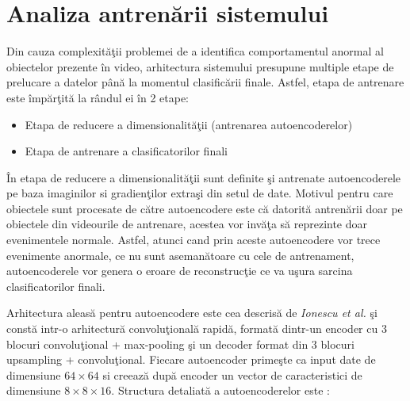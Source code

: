 \documentclass[a4paper,12pt]{report}
\begin{document}
\section{Analiza antrenării sistemului}
\quad Din cauza complexităţii problemei de a identifica comportamentul anormal al obiectelor prezente în video, arhitectura sistemului presupune multiple etape de prelucare a datelor până la momentul clasificării finale. Astfel, etapa de antrenare este împărţită la rândul ei în 2 etape:
\begin{itemize}
\item Etapa de reducere a dimensionalităţii (antrenarea autoencoderelor)
\item Etapa de antrenare a clasificatorilor finali
\end{itemize}
\par În etapa de reducere a dimensionalităţii sunt definite şi antrenate autoencoderele pe baza imaginilor si gradienţilor extraşi din setul de date. Motivul pentru care obiectele sunt procesate de către autoencodere este că datorită antrenării doar pe obiectele din videourile de antrenare, acestea vor invăţa să reprezinte doar evenimentele normale. Astfel, atunci cand prin aceste autoencodere vor trece evenimente anormale, ce nu sunt asemanătoare cu cele de antrenament, autoencoderele vor genera o eroare de reconstrucţie ce va uşura sarcina clasificatorilor finali.
\par Arhitectura aleasă pentru autoencodere este cea descrisă de \emph{Ionescu et al.}  \cite{ionescu2019object} şi constă intr-o arhitectură convoluţională rapidă, formată dintr-un encoder cu 3 blocuri convoluţional + max-pooling şi un decoder format din 3 blocuri upsampling + convoluţional. Fiecare autoencoder primeşte ca input date de dimensiune \(64 \times 64\) si creează după encoder un vector de caracteristici de dimensiune \(8 \times 8 \times 16\).  Structura detaliată a autoencoderelor este : 
\end{document}
